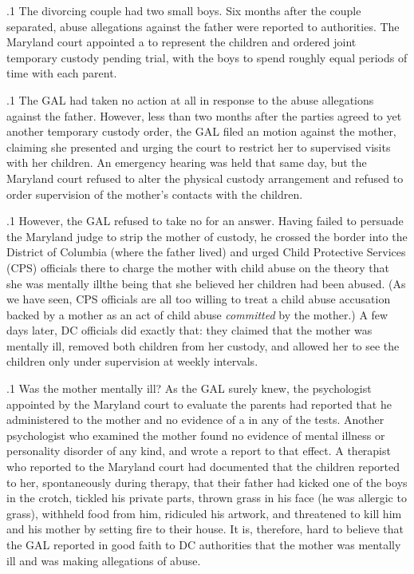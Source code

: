 \documentclass[11pt, twoside]{article}
\begin{document}
{\p.1{%
The divorcing couple had two small boys. Six months after the couple
separated, abuse allegations against the father were reported to authorities. The Maryland court appointed a  to represent
the children and ordered joint temporary custody pending trial, with
the boys to spend roughly equal periods of time with each parent.
}%

\p.1{%
The GAL had taken no action at all in response to the abuse allegations against the father. However, less than two months after the parties
agreed to yet another temporary custody order, the GAL filed an  motion against the mother, claiming she presented  and urging the court to restrict her to
supervised visits with her children. An emergency hearing was held that
same day, but the Maryland court refused to alter the physical custody
arrangement and refused to order supervision of the mother’s contacts
with the children.
}%

\p.1{%
However, the GAL refused to take no for an answer. Having failed
to persuade the Maryland judge to strip the mother of custody, he
crossed the border into the District of Columbia (where the father lived)
and urged Child Protective Services (CPS) officials there to charge the
mother with child abuse on the theory that she was mentally ill\mdash{}the
 being that she believed her children had been abused. (As we
have seen, CPS officials are all too willing to treat a child abuse accusation backed by a mother as an act of child abuse \textit{committed} by the
mother.) A few days later, DC officials did exactly
that: they claimed that the mother was mentally ill, removed both children from her custody, and allowed her to see the children only under
supervision at weekly intervals.
}%

\p.1{%
Was the mother mentally ill? As the GAL surely knew, the psychologist appointed by the Maryland court to evaluate the parents had
reported that  he administered to the mother and no evidence of a
 in any of the tests. Another psychologist who examined the mother found no evidence of mental illness or personality
disorder of any kind, and wrote a report to that effect. A therapist who
reported to the Maryland court had documented that the children reported to her, spontaneously during therapy, that their father had kicked
one of the boys in the crotch, tickled his private parts, thrown grass in
his face (he was allergic to grass), withheld food from him, ridiculed his
artwork, and threatened to kill him and his mother by setting fire to their
house. It is, therefore, hard to believe that the GAL reported in good
faith to DC authorities that the mother was mentally
ill and was making  allegations of abuse.
}%

}
\end{document}
